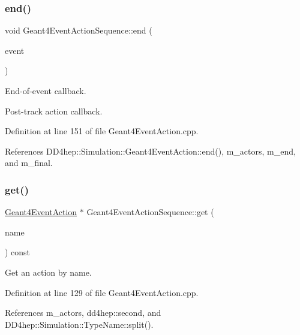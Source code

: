 \subsubsection{\texorpdfstring{end()}{end()}}
{\footnotesize\ttfamily void Geant4\+Event\+Action\+Sequence\+::end (\begin{DoxyParamCaption}\item[{const G4\+Event $\ast$}]{event }\end{DoxyParamCaption})\hspace{0.3cm}{\ttfamily [virtual]}}



End-\/of-\/event callback. 

Post-\/track action callback. 

Definition at line 151 of file Geant4\+Event\+Action.\+cpp.



References D\+D4hep\+::\+Simulation\+::\+Geant4\+Event\+Action\+::end(), m\+\_\+actors, m\+\_\+end, and m\+\_\+final.

\hypertarget{class_d_d4hep_1_1_simulation_1_1_geant4_event_action_sequence_a6ea64e0a8834b3ce73b66191d8055c81}{}\label{class_d_d4hep_1_1_simulation_1_1_geant4_event_action_sequence_a6ea64e0a8834b3ce73b66191d8055c81} 
\subsubsection{\texorpdfstring{get()}{get()}}
{\footnotesize\ttfamily \hyperlink{class_d_d4hep_1_1_simulation_1_1_geant4_event_action}{Geant4\+Event\+Action} $\ast$ Geant4\+Event\+Action\+Sequence\+::get (\begin{DoxyParamCaption}\item[{const std\+::string \&}]{name }\end{DoxyParamCaption}) const}



Get an action by name. 



Definition at line 129 of file Geant4\+Event\+Action.\+cpp.



References m\+\_\+actors, dd4hep\+::second, and D\+D4hep\+::\+Simulation\+::\+Type\+Name\+::split().

